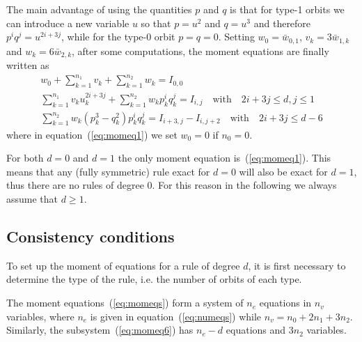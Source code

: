 \documentclass{article}
\begin{document}
The main advantage of using the quantities $p$ and $q$ is that for type-1 orbits we can introduce a new variable $u$ so that $p=u^2$ and $q=u^3$ and therefore $p^i q^j = u^{2 i + 3 j}$, while for the type-0 orbit $p=q=0$. Setting $w_0 = \bar{w}_{0,1}$, $v_k = 3 \bar{w}_{1,k}$ and $w_k = 6 \bar{w}_{2,k}$, after some computations, the moment equations are finally written as
\begin{subequations}
\label{eq:momeqs}
\begin{gather}
  \label{eq:momeq1}
  w_0 + \sum_{k=1}^{n_1} v_k + \sum_{k=1}^{n_2} w_k = I_{0,0}\\
  \label{eq:momeq3}
  \sum_{k=1}^{n_1} v_k u_k^{2i+3j} + \sum_{k=1}^{n_2} w_k p_k^i q_k^j = I_{i,j}
  \quad\text{with}\quad  2i+3j \leq d, j \leq 1\\
  \label{eq:momeq6}
  \sum_{k=1}^{n_2} w_k (p_k^3-q_k^2) p_k^i q_k^j = I_{i+3,j} - I_{i,j+2}
  \quad\text{with}\quad 2i+3j \leq d-6
\end{gather}
\end{subequations}
where in equation~(\ref{eq:momeq1}) we set $w_0=0$ if $n_0=0$.

For both $d=0$ and $d=1$ the only moment equation is~(\ref{eq:momeq1}). This means that any (fully symmetric) rule exact for $d=0$ will also be exact for $d=1$, thus there are no rules of degree 0. For this reason in the following we always assume that $d \geq 1$.




\subsection{Consistency conditions}
\label{sec:conscond}

To set up the moment of equations for a rule of degree $d$, it is first necessary to determine the type of the rule, i.e. the number of orbits of each type.

The moment equations~(\ref{eq:momeqs}) form a system of $n_e$ equations in $n_v$ variables, where $n_e$ is given in equation~(\ref{eq:numeqs}) while $n_v = n_0 + 2 n_1 + 3 n_2$. Similarly, the subsystem~(\ref{eq:momeq6}) has $n_e-d$ equations and $3 n_2$ variables.
\end{document}
